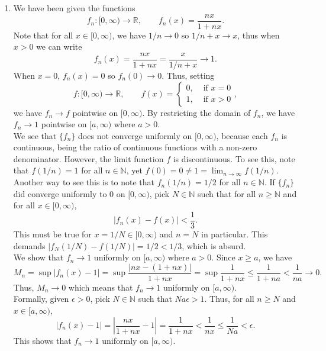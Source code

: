 \documentclass[10pt]{article}
\def\R{\mathbb{R}}
\def\N{\mathbb{N}}
\begin{document}
\begin{enumerate}
        \item We have been given the functions \[
            f_n\colon [0, \infty) \to \R, \qquad f_n(x) = \frac{nx}{1 + nx}.
        \] Note that for all $x \in [0, \infty)$, we have $1 /n \to 0$ so $1 /n + x
        \to x$, thus when $x > 0$ we can write \[
            f_n(x) = \frac{nx}{1 + nx} = \frac{x}{1 /n + x} \to 1.
        \] When $x = 0$, $f_n(x) = 0$ so $f_n(0) \to 0$. Thus, setting \[
            f\colon [0,\infty) \to \R, \qquad f(x) = \begin{cases}
                0, &\text{ if } x = 0 \\
                1, &\text{ if } x > 0
            \end{cases},
        \] we have $f_n \to f$ pointwise on $[0, \infty)$. By restricting the domain
        of $f_n$, we have $f_n \to 1$ pointwise on $[a, \infty)$ where $a > 0$. \\

        We see that $\{f_n\}$ does not converge uniformly on $[0, \infty)$, because
        each $f_n$ is continuous, being the ratio of continuous functions with a
        non-zero denominator. However, the limit function $f$ is discontinuous. To
        see this, note that $f(1 /n) = 1$ for all $n \in \N$, yet
        $f(0) = 0 \neq 1 = \lim_{n\to \infty} f(1 /n)$. \\

        Another way to see this is to note that $f_n(1 /n) = 1 / 2$ for all $n \in \N$.
        If $\{f_n\}$ did converge uniformly to $0$ on $[0, \infty)$, pick $N \in \N$
        such that for all $n \geq \N$ and for all $x \in [0, \infty)$, \[
            |f_n(x) - f(x)| < \frac{1}{3}.
        \] This must be true for $x = 1 / N \in [0, \infty)$ and $n = N$ in
        particular.  This demands $|f_N(1 /N) - f(1 /N)| = 1 / 2 < 1 /3$, which is
        absurd. \\

        We show that $f_n \to 1$ uniformly on $[a, \infty)$ where $a > 0$.
        Since $x \geq a$, we have \[
            M_n = \sup|f_n(x) - 1| = \sup \frac{|nx - (1 + nx)|}{1 + nx} = \sup
            \frac{1}{1 + nx} \leq \frac{1}{1 + na} < \frac{1}{na} \to 0.
        \] Thus, $M_n \to 0$ which means that $f_n \to 1$ uniformly on $[a,
        \infty)$. \\
    
        Formally, given $\epsilon > 0$, pick $N \in \N$ such that $Na\epsilon > 1$.
        Thus, for all $n \geq N$ and $x \in [a, \infty)$, \[
            |f_n(x) - 1| = \left|\frac{nx}{1 + nx} - 1\right| = \frac{1}{1 + nx}
            < \frac{1}{nx} \leq \frac{1}{Na} < \epsilon.
        \] This shows that $f_n \to 1$ uniformly on $[a, \infty)$.


\end{enumerate}
\end{document}
